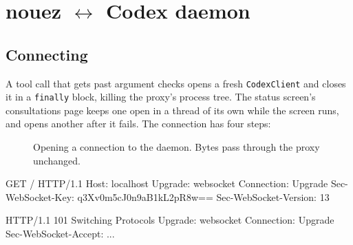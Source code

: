 \documentclass[10pt,a4paper]{article}
\newcommand{\lifelines}[2]{%
  \foreach \x/\name/\col in {#1} {%
    \node[actor, draw=\col, text=\col] at (\x,0) {\name};
    \draw[lifeline] (\x,-0.4) -- (\x,-#2);
  }}
\newcommand{\msg}[4]{\draw[call] (#2,-#1) -- node[above=1pt,lbl]{#4} (#3,-#1);}
\newcommand{\ret}[4]{\draw[reply] (#2,-#1) -- node[above=1pt,lbl]{#4} (#3,-#1);}
\newcommand{\side}[3]{\node[note, anchor=west] at (#2+0.15,-#1) {#3};}
\newcommand{\code}[1]{\texttt{#1}}
\begin{document}
\section{nouez \texorpdfstring{$\leftrightarrow$}{<->} Codex daemon}
\label{sec:codex}

\subsection{Connecting}

A tool call that gets past argument checks opens a fresh \code{CodexClient} and closes it in a
\code{finally} block, killing the proxy's process tree. The status screen's consultations page
keeps one open in a thread of its own while the screen runs, and opens another after it fails. The
connection has four steps:

\begin{figure}[H]
\centering
{}
\caption{Opening a connection to the daemon. Bytes pass through the proxy unchanged.}
\end{figure}

\begin{plain}
GET / HTTP/1.1
Host: localhost
Upgrade: websocket
Connection: Upgrade
Sec-WebSocket-Key: q3Xv0m5cJ0n9aB1kL2pR8w==
Sec-WebSocket-Version: 13
\end{plain}
\begin{plain}
HTTP/1.1 101 Switching Protocols
Upgrade: websocket
Connection: Upgrade
Sec-WebSocket-Accept: ...
\end{plain}
\end{document}
